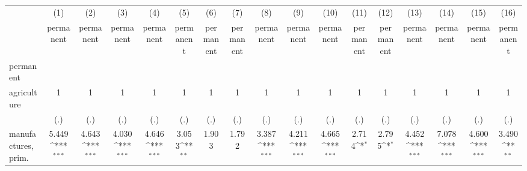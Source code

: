 {
\def\sym#1{\ifmmode^{#1}\else\(^{#1}\)\fi}
\begin{tabular}{l*{16}{c}}
\hline\hline
                    &\multicolumn{1}{c}{(1)}&\multicolumn{1}{c}{(2)}&\multicolumn{1}{c}{(3)}&\multicolumn{1}{c}{(4)}&\multicolumn{1}{c}{(5)}&\multicolumn{1}{c}{(6)}&\multicolumn{1}{c}{(7)}&\multicolumn{1}{c}{(8)}&\multicolumn{1}{c}{(9)}&\multicolumn{1}{c}{(10)}&\multicolumn{1}{c}{(11)}&\multicolumn{1}{c}{(12)}&\multicolumn{1}{c}{(13)}&\multicolumn{1}{c}{(14)}&\multicolumn{1}{c}{(15)}&\multicolumn{1}{c}{(16)}\\
                    &\multicolumn{1}{c}{permanent}&\multicolumn{1}{c}{permanent}&\multicolumn{1}{c}{permanent}&\multicolumn{1}{c}{permanent}&\multicolumn{1}{c}{permanent}&\multicolumn{1}{c}{permanent}&\multicolumn{1}{c}{permanent}&\multicolumn{1}{c}{permanent}&\multicolumn{1}{c}{permanent}&\multicolumn{1}{c}{permanent}&\multicolumn{1}{c}{permanent}&\multicolumn{1}{c}{permanent}&\multicolumn{1}{c}{permanent}&\multicolumn{1}{c}{permanent}&\multicolumn{1}{c}{permanent}&\multicolumn{1}{c}{permanent}\\
\hline
permanent           &                     &                     &                     &                     &                     &                     &                     &                     &                     &                     &                     &                     &                     &                     &                     &                     \\
agriculture         &           1         &           1         &           1         &           1         &           1         &           1         &           1         &           1         &           1         &           1         &           1         &           1         &           1         &           1         &           1         &           1         \\
                    &         (.)         &         (.)         &         (.)         &         (.)         &         (.)         &         (.)         &         (.)         &         (.)         &         (.)         &         (.)         &         (.)         &         (.)         &         (.)         &         (.)         &         (.)         &         (.)         \\
[1em]
manufactures, prim. &       5.449\sym{***}&       4.643\sym{***}&       4.030\sym{***}&       4.646\sym{***}&       3.053\sym{**} &       1.903         &       1.792         &       3.387\sym{***}&       4.211\sym{***}&       4.665\sym{***}&       2.714\sym{*}  &       2.795\sym{*}  &       4.452\sym{***}&       7.078\sym{***}&       4.600\sym{***}&       3.490\sym{**} \\

\end{tabular}}
